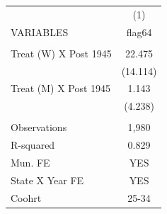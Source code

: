\begin{tabular}{lc} \hline
 & (1) \\
VARIABLES & flag64 \\ \hline
 &  \\
Treat (W) X Post 1945 & 22.475 \\
 & (14.114) \\
Treat (M) X Post 1945 & 1.143 \\
 & (4.238) \\
 &  \\
Observations & 1,980 \\
R-squared & 0.829 \\
Mun. FE & YES \\
State X Year FE & YES \\
 Coohrt & 25-34 \\ \hline
\end{tabular}
